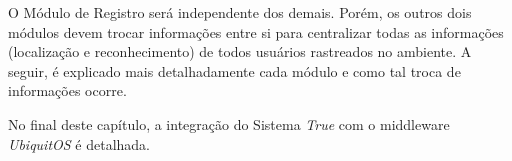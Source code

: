 O Módulo de Registro será independente dos demais. Porém, os outros dois módulos devem trocar informações entre si para centralizar todas as informações (localização e reconhecimento) de todos usuários rastreados no ambiente. A seguir, é explicado mais detalhadamente cada módulo e como tal troca de informações ocorre.

No final deste capítulo, a integração do Sistema \textit{True} com o middleware \textit{UbiquitOS} é detalhada.






















